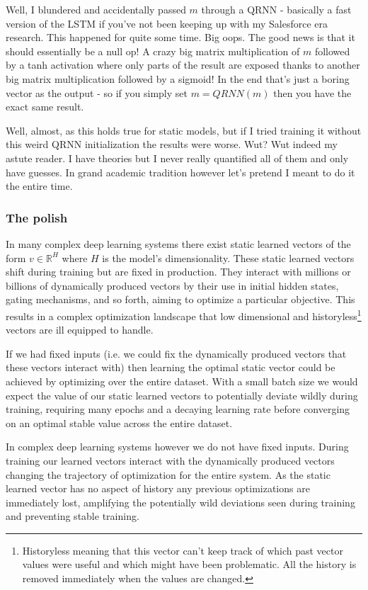 \documentclass{article}
\begin{document}
Well, I blundered and accidentally passed $m$ through a QRNN - basically a fast version of the LSTM if you've not been keeping up with my Salesforce era research.
This happened for quite some time.
Big oops.
The good news is that it should essentially be a null op!
A crazy big matrix multiplication of $m$ followed by a tanh activation where only parts of the result are exposed thanks to another big matrix multiplication followed by a sigmoid!
In the end that's just a boring vector as the output - so if you simply set $m = \textit{QRNN}(m)$ then you have the exact same result.

Well, almost, as this holds true for static models, but if I tried training it without this weird QRNN initialization the results were worse.
Wut?
Wut indeed my astute reader.
I have theories but I never really quantified all of them and only have guesses.
In grand academic tradition however let's pretend I meant to do it the entire time.

\subsubsection{The polish}

In many complex deep learning systems there exist static learned vectors of the form $v \in \mathbb{R}^H$ where $H$ is the model's dimensionality.
These static learned vectors shift during training but are fixed in production.
They interact with millions or billions of dynamically produced vectors by their use in initial hidden states, gating mechanisms, and so forth, aiming to optimize a particular objective.
This results in a complex optimization landscape that low dimensional and historyless\footnote{Historyless meaning that this vector can't keep track of which past vector values were useful and which might have been problematic. All the history is removed immediately when the values are changed.} vectors are ill equipped to handle.

If we had fixed inputs (i.e. we could fix the dynamically produced vectors that these vectors interact with) then learning the optimal static vector could be achieved by optimizing over the entire dataset.
With a small batch size we would expect the value of our static learned vectors to potentially deviate wildly during training, requiring many epochs and a decaying learning rate before converging on an optimal stable value across the entire dataset.

In complex deep learning systems however we do not have fixed inputs.
During training our learned vectors interact with the dynamically produced vectors changing the trajectory of optimization for the entire system.
As the static learned vector has no aspect of history any previous optimizations are immediately lost, amplifying the potentially wild deviations seen during training and preventing stable training.
\end{document}
